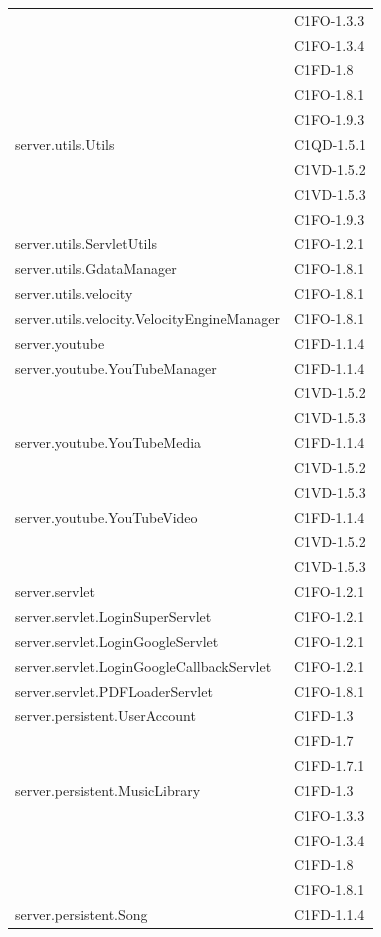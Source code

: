 \begin{footnotesize}
\begin{longtable}[!h]{|l|l|}
& C1FO-1.3.3\\
& C1FO-1.3.4\\
& C1FD-1.8\\
& C1FO-1.8.1\\
& C1FO-1.9.3\\\hline  
server.utils.Utils  & C1QD-1.5.1\\
& C1VD-1.5.2\\
& C1VD-1.5.3\\
& C1FO-1.9.3\\\hline 
server.utils.ServletUtils  &  C1FO-1.2.1 \\\hline
server.utils.GdataManager & C1FO-1.8.1 \\\hline
server.utils.velocity & C1FO-1.8.1 \\\hline
server.utils.velocity.VelocityEngineManager & C1FO-1.8.1 \\\hline
server.youtube  &  C1FD-1.1.4 \\\hline
server.youtube.YouTubeManager  &  C1FD-1.1.4 \\
& C1VD-1.5.2\\
& C1VD-1.5.3\\\hline
server.youtube.YouTubeMedia  &  C1FD-1.1.4 \\
& C1VD-1.5.2\\
& C1VD-1.5.3\\\hline
server.youtube.YouTubeVideo  &  C1FD-1.1.4 \\
& C1VD-1.5.2\\
& C1VD-1.5.3\\\hline
server.servlet  &  C1FO-1.2.1 \\\hline 
server.servlet.LoginSuperServlet  &  C1FO-1.2.1 \\\hline 
server.servlet.LoginGoogleServlet  &  C1FO-1.2.1 \\\hline 
server.servlet.LoginGoogleCallbackServlet  &  C1FO-1.2.1 \\\hline
server.servlet.PDFLoaderServlet & C1FO-1.8.1 \\\hline  
server.persistent.UserAccount  &  C1FD-1.3\\
& C1FD-1.7\\
& C1FD-1.7.1\\\hline 
server.persistent.MusicLibrary  &  C1FD-1.3 \\
& C1FO-1.3.3\\
& C1FO-1.3.4\\
& C1FD-1.8\\
& C1FO-1.8.1\\\hline 
server.persistent.Song  &  C1FD-1.1.4 \\

\end{longtable}
\end{footnotesize}

